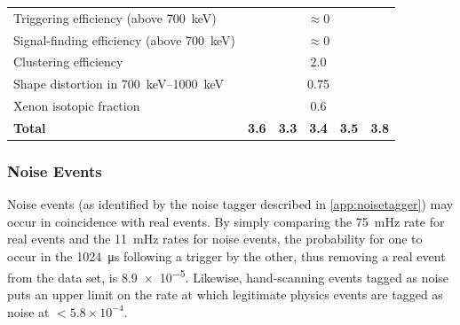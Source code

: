 \documentclass[herrin-thesis.tex]{subfiles}
\begin{document}
\begin{table}[tbp]
\begin{tabular}{p{} c c c c c}
Triggering efficiency	(above \SI{700}{\keV})			&	\multicolumn{5}{c}{\(\approx 0\)}			\\
Signal-finding efficiency (above \SI{700}{\keV})		&	\multicolumn{5}{c}{\(\approx 0\)}			\\
Clustering efficiency								&	\multicolumn{5}{c}{\(2.0\)}	\\
Shape distortion in \SIrange{700}{1000}{\keV}			&	\multicolumn{5}{c}{0.75}					\\
Xenon isotopic fraction							&	\multicolumn{5}{c}{0.6}					\\\midrule
\textbf{Total}									&\textbf{3.6}&\textbf{3.3}&\textbf{3.4}&\textbf{3.5}&\textbf{3.8}\\\bottomrule
\end{tabular}
\end{table}

\subsubsection{Noise Events}
Noise events (as identified by the noise tagger described in \cref{app:noisetagger}) may occur in coincidence with real events. By simply comparing the \SI{75}{\milli\Hz} rate for real events and the \SI{11}{\milli\Hz} rates for noise events, the probability for one to occur in the \SI{1024}{\micro\s} following a trigger by the other, thus removing a real event from the data set, is \num{8.9e-5}. Likewise, hand-scanning events tagged as noise puts an upper limit on the rate at which legitimate physics events are tagged as noise at \(< 5.8\times10^{-4}\).
\end{document}
